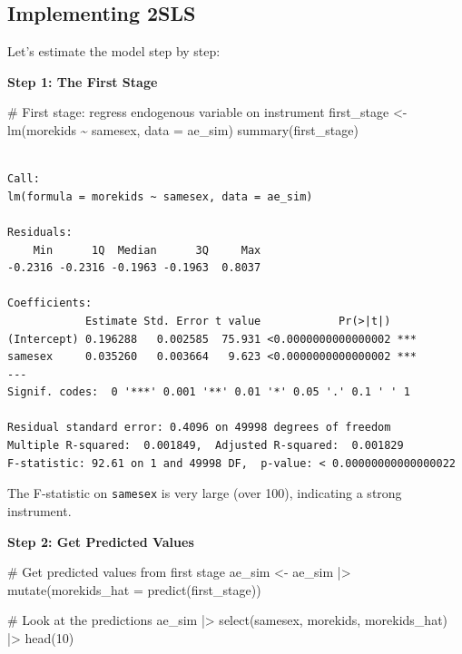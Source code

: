 \documentclass[
  letterpaper,
  DIV=11,
  numbers=noendperiod]{scrreprt}
\newenvironment{Shaded}{\begin{snugshade}}{\end{snugshade}}
\newcommand{\AttributeTok}[1]{\textcolor[rgb]{0.40,0.45,0.13}{#1}}
\newcommand{\CommentTok}[1]{\textcolor[rgb]{0.37,0.37,0.37}{#1}}
\newcommand{\DecValTok}[1]{\textcolor[rgb]{0.68,0.00,0.00}{#1}}
\newcommand{\FunctionTok}[1]{\textcolor[rgb]{0.28,0.35,0.67}{#1}}
\newcommand{\NormalTok}[1]{\textcolor[rgb]{0.00,0.23,0.31}{#1}}
\newcommand{\OtherTok}[1]{\textcolor[rgb]{0.00,0.23,0.31}{#1}}
\newcommand{\SpecialCharTok}[1]{\textcolor[rgb]{0.37,0.37,0.37}{#1}}
\begin{document}
\subsection{Implementing 2SLS}\label{implementing-2sls}

Let's estimate the model step by step:

\textbf{Step 1: The First Stage}

\begin{Shaded}
\begin{Highlighting}[]
\CommentTok{\# First stage: regress endogenous variable on instrument}
\NormalTok{first\_stage }\OtherTok{\textless{}{-}} \FunctionTok{lm}\NormalTok{(morekids }\SpecialCharTok{\textasciitilde{}}\NormalTok{ samesex, }\AttributeTok{data =}\NormalTok{ ae\_sim)}
\FunctionTok{summary}\NormalTok{(first\_stage)}
\end{Highlighting}
\end{Shaded}

\begin{verbatim}

Call:
lm(formula = morekids ~ samesex, data = ae_sim)

Residuals:
    Min      1Q  Median      3Q     Max 
-0.2316 -0.2316 -0.1963 -0.1963  0.8037 

Coefficients:
            Estimate Std. Error t value            Pr(>|t|)    
(Intercept) 0.196288   0.002585  75.931 <0.0000000000000002 ***
samesex     0.035260   0.003664   9.623 <0.0000000000000002 ***
---
Signif. codes:  0 '***' 0.001 '**' 0.01 '*' 0.05 '.' 0.1 ' ' 1

Residual standard error: 0.4096 on 49998 degrees of freedom
Multiple R-squared:  0.001849,  Adjusted R-squared:  0.001829 
F-statistic: 92.61 on 1 and 49998 DF,  p-value: < 0.00000000000000022
\end{verbatim}

The F-statistic on \texttt{samesex} is very large (over 100), indicating
a strong instrument.

\textbf{Step 2: Get Predicted Values}

\begin{Shaded}
\begin{Highlighting}[]
\CommentTok{\# Get predicted values from first stage}
\NormalTok{ae\_sim }\OtherTok{\textless{}{-}}\NormalTok{ ae\_sim }\SpecialCharTok{|\textgreater{}}
    \FunctionTok{mutate}\NormalTok{(}\AttributeTok{morekids\_hat =} \FunctionTok{predict}\NormalTok{(first\_stage))}

\CommentTok{\# Look at the predictions}
\NormalTok{ae\_sim }\SpecialCharTok{|\textgreater{}}
    \FunctionTok{select}\NormalTok{(samesex, morekids, morekids\_hat) }\SpecialCharTok{|\textgreater{}}
    \FunctionTok{head}\NormalTok{(}\DecValTok{10}\NormalTok{)}
\end{Highlighting}
\end{Shaded}
\end{document}
